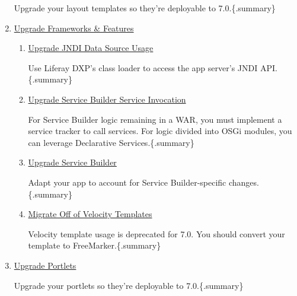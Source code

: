\begin{enumerate}
  Upgrade your layout templates so they're deployable to
  7.0.\{.summary\}
\item
  \href{/docs/7-2/tutorials/-/knowledge_base/t/upgrading-frameworks-and-features}{Upgrade
  Frameworks \& Features}

  \begin{enumerate}
  \def\labelenumii{\arabic{enumii}.}
  \item
    \href{/docs/7-2/tutorials/-/knowledge_base/t/upgrading-jndi-data-source-usage}{Upgrade
    JNDI Data Source Usage}

    Use Liferay DXP's class loader to access the app server's JNDI
    API.\{.summary\}
  \item
    \href{/docs/7-2/tutorials/-/knowledge_base/t/upgrading-service-builder-service-invocation}{Upgrade
    Service Builder Service Invocation}

    For Service Builder logic remaining in a WAR, you must implement a
    service tracker to call services. For logic divided into OSGi
    modules, you can leverage Declarative Services.\{.summary\}
  \item
    \href{/docs/7-2/tutorials/-/knowledge_base/t/upgrading-service-builder}{Upgrade
    Service Builder}

    Adapt your app to account for Service Builder-specific
    changes.\{.summary\}
  \item
    \href{/docs/7-2/tutorials/-/knowledge_base/t/migrating-off-of-velocity-templates}{Migrate
    Off of Velocity Templates}

    Velocity template usage is deprecated for 7.0. You should convert
    your template to FreeMarker.\{.summary\}
  \end{enumerate}
\item
  \href{/docs/7-2/tutorials/-/knowledge_base/t/upgrading-portlets}{Upgrade
  Portlets}

  Upgrade your portlets so they're deployable to 7.0.\{.summary\}


\end{enumerate}
